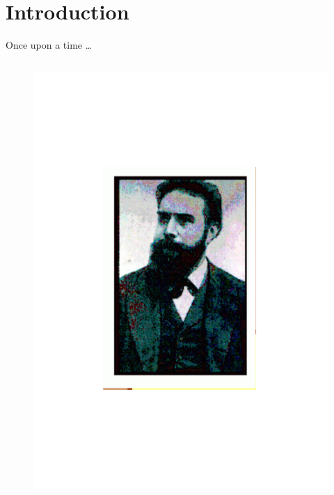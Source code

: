 \section{Introduction}


\begin{frame}{Once upon a time \ldots}

\begin{columns}[T]

    \begin{column}{.5\textwidth}
    
\begin{minipage}[c][.6\textheight][c]{\linewidth}
\begin{figure}
\includegraphics[scale=0.3]{figures/roentgen.pdf}
\end{figure}    
\end{minipage}    
    

\end{column}
\end{columns}
\end{frame}
